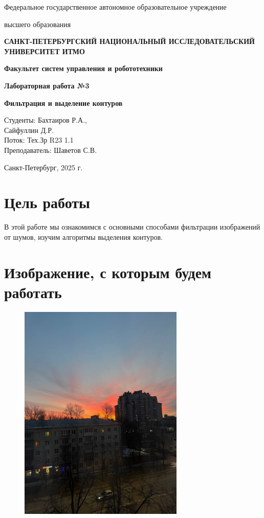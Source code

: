 \documentclass[a4paper,12pt]{article}
\begin{document}
    

\begin{titlepage}
    \centering
    {\large Федеральное государственное автономное образовательное учреждение\par}
    {\large высшего образования\par}
    {\bfseries САНКТ-ПЕТЕРБУРГСКИЙ НАЦИОНАЛЬНЫЙ ИССЛЕДОВАТЕЛЬСКИЙ УНИВЕРСИТЕТ ИТМО\par}
    {\bfseries Факультет систем управления и робототехники\par}
    \vfill
    {\Large \bfseries Лабораторная работа №3\par}
    {\Large \bfseries Фильтрация и выделение контуров\par}
    \vfill
    
    \begin{flushright}
        Студенты: Бахтаиров Р.А.,\\ Сайфуллин Д.Р. \\
        Поток: Тех.Зр R23 1.1 \\
        Преподаватель: Шаветов С.В.
    \end{flushright}
    \vfill
    Санкт-Петербург, 2025 г.
\end{titlepage}

\tableofcontents
\newpage

\section{Цель работы}
В этой работе мы ознакомимся с основными способами фильтрации изображений от шумов, изучим алгоритмы выделения контуров.

\section{Изображение, с которым будем работать}
\begin{figure}[H]
    \centering
    \includegraphics[width=0.7\textwidth]{images/my_img.png}
\end{figure}
\end{document}
